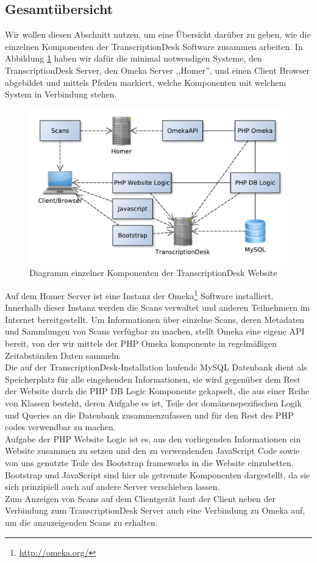 \documentclass{article}
\begin{document}
\subsection{Gesamtübersicht}
Wir wollen diesen Abschnitt nutzen, um eine Übersicht darüber zu geben,
wie die einzelnen Komponenten der TranscriptionDesk Software zusammen arbeiten.
In Abbildung \ref{fig:components} haben wir dafür die minimal notwendigen Systeme,
den TranscriptionDesk Server, den Omeka Server ,,Homer'', und einen Client Browser abgebildet
und mittels Pfeilen markiert, welche Komponenten mit welchem System in Verbindung stehen.
\\\begin{figure}[H]
\includegraphics[width=\textwidth]{../notes/components.pdf}
\caption{Diagramm einzelner Komponenten der TranscriptionDesk Website}
\label{fig:components}
\end{figure}
Auf dem Homer Server ist eine Instanz der Omeka\footnote{\url{http://omeka.org/}} Software installiert.
Innerhalb dieser Instanz werden die Scans verwaltet und anderen Teilnehmern im Internet bereitgestellt.
Um Informationen über einzelne Scans, deren Metadaten und Sammlungen von Scans verfügbar zu machen,
stellt Omeka eine eigene API bereit, von der wir mittels der PHP Omeka komponente in regelmäßigen Zeitabständen Daten sammeln.\\
Die auf der TranscriptionDesk-Installation laufende MySQL Datenbank dient als Speicherplatz für alle eingehenden Informationen,
sie wird gegenüber dem Rest der Website durch die PHP DB Logic Komponente gekapselt,
die aus einer Reihe von Klassen besteht, deren Aufgabe es ist,
Teile der domänenspezifischen Logik und Queries an die Datenbank zusammenzufassen
und für den Rest des PHP codes verwendbar zu machen.\\
Aufgabe der PHP Website Logic ist es, aus den vorliegenden Informationen ein Website zusammen zu setzen
und den zu verwendenden JavaScript Code sowie von uns genutzte Teile des Bootstrap frameworks in die Website einzubetten.
Bootstrap und JavaScript sind hier als getrennte Komponenten dargestellt,
da sie sich prinzipiell auch auf andere Server verschieben lassen.\\
Zum Anzeigen von Scans auf dem Clientgerät baut der Client neben der Verbindung zum TranscriptionDesk Server auch eine Verbindung zu Omeka auf,
um die anzuzeigenden Scans zu erhalten.
\end{document}
